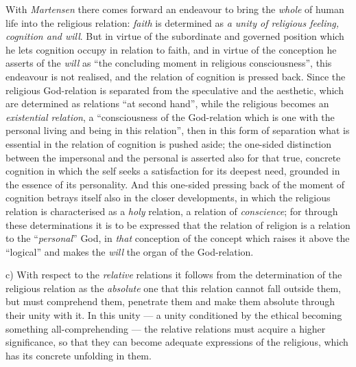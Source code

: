 \documentclass[12pt,a4paper]{book}
\begin{document}
With \emph{Martensen} there comes forward an endeavour to bring the
\emph{whole} of human life into the religious relation: \emph{faith} is
determined as \emph{a unity of religious feeling, cognition and will}. But in
virtue of the subordinate and governed position which he lets cognition occupy
in relation to faith, and in virtue of the conception he asserts of the
\emph{will} as ``the concluding moment in religious consciousness'', this
endeavour is not realised, and the relation of cognition is pressed back.
Since the religious God-relation is separated from the speculative and the
aesthetic, which are determined as relations ``at second hand'', while the
religious becomes an \emph{existential relation}, a ``consciousness of the
God-relation which is one with the personal living and being in this
relation'', then in this form of separation what is essential in the relation
of cognition is pushed aside; the one-sided distinction between the impersonal
and the personal is
asserted also for that true, concrete cognition in which the self seeks a
satisfaction for its deepest need, grounded in the essence of its personality.
And this one-sided pressing back of the moment of cognition betrays itself
also in the closer developments, in which the religious relation is
characterised as a \emph{holy} relation, a relation of \emph{conscience}; for
through these determinations it is to be expressed that the relation of
religion is a relation to the ``\emph{personal}'' God, in \emph{that}
conception of the concept which raises it above the ``logical'' and makes the
\emph{will} the organ of the God-relation.

c) With respect to the \emph{relative} relations it follows from the
determination of the religious relation as the \emph{absolute} one that this
relation cannot fall outside them, but must comprehend them, penetrate them
and make them absolute through their unity with it. In this unity --- a unity
conditioned by the ethical becoming something all-comprehending --- the
relative relations must acquire a higher significance, so that they can become
adequate expressions of the religious, which has its concrete unfolding in
them.
\end{document}
